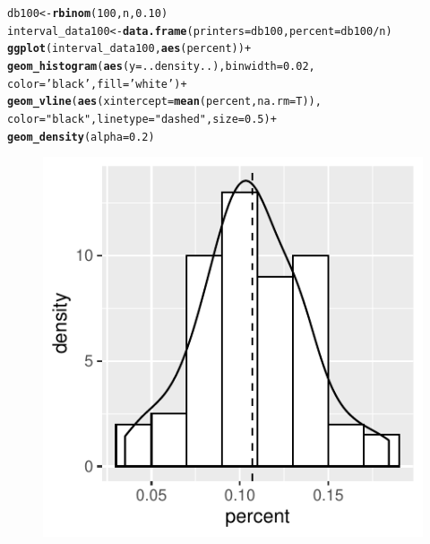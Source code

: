 \documentclass[10pt]{report}\usepackage[]{graphicx}\usepackage[]{xcolor}
\makeatletter
\def\maxwidth{ %
  \ifdim\Gin@nat@width>\linewidth
    \linewidth
  \else
    \Gin@nat@width
  \fi
}
\newcommand{\hlnum}[1]{\textcolor[rgb]{0.686,0.059,0.569}{#1}}%
\newcommand{\hlstr}[1]{\textcolor[rgb]{0.192,0.494,0.8}{#1}}%
\newcommand{\hlopt}[1]{\textcolor[rgb]{0,0,0}{#1}}%
\newcommand{\hlstd}[1]{\textcolor[rgb]{0.345,0.345,0.345}{#1}}%
\newcommand{\hlkwb}[1]{\textcolor[rgb]{0.69,0.353,0.396}{#1}}%
\newcommand{\hlkwc}[1]{\textcolor[rgb]{0.333,0.667,0.333}{#1}}%
\newcommand{\hlkwd}[1]{\textcolor[rgb]{0.737,0.353,0.396}{\textbf{#1}}}%
\newenvironment{kframe}{%
 \def\at@end@of@kframe{}%
 \ifinner\ifhmode%
  \def\at@end@of@kframe{\end{minipage}}%
  \begin{minipage}{\columnwidth}%
 \fi\fi%
 \def\FrameCommand##1{\hskip\@totalleftmargin \hskip-\fboxsep
 \colorbox{shadecolor}{##1}\hskip-\fboxsep
     \hskip-\linewidth \hskip-\@totalleftmargin \hskip\columnwidth}%
 \MakeFramed {\advance\hsize-\width
   \@totalleftmargin\z@ \linewidth\hsize
   \@setminipage}}%
 {\par\unskip\endMakeFramed%
 \at@end@of@kframe}
\newenvironment{knitrout}{}{} %
\makeatother
\begin{document}
\begin{easylist}[enumerate]
\begin{knitrout}
\color{fgcolor}\begin{kframe}
\begin{alltt}
         \hlstd{db100} \hlkwb{<-} \hlkwd{rbinom}\hlstd{(}\hlnum{100}\hlstd{, n,} \hlnum{0.10}\hlstd{)}
         \hlstd{interval_data100} \hlkwb{<-} \hlkwd{data.frame}\hlstd{(}\hlkwc{printers}\hlstd{=db100,} \hlkwc{percent}\hlstd{=db100}\hlopt{/}\hlstd{n)}
         \hlkwd{ggplot}\hlstd{(interval_data100,} \hlkwd{aes}\hlstd{(percent))} \hlopt{+}
                    \hlkwd{geom_histogram}\hlstd{(}\hlkwd{aes}\hlstd{(}\hlkwc{y}\hlstd{=..density..),} \hlkwc{binwidth}\hlstd{=}\hlnum{0.02}\hlstd{,}
                                   \hlkwc{color}\hlstd{=}\hlstr{'black'}\hlstd{,} \hlkwc{fill}\hlstd{=}\hlstr{'white'}\hlstd{)} \hlopt{+}
                    \hlkwd{geom_vline}\hlstd{(}\hlkwd{aes}\hlstd{(}\hlkwc{xintercept}\hlstd{=}\hlkwd{mean}\hlstd{(percent,} \hlkwc{na.rm}\hlstd{=T)),}
                               \hlkwc{color}\hlstd{=}\hlstr{"black"}\hlstd{,} \hlkwc{linetype}\hlstd{=}\hlstr{"dashed"}\hlstd{,} \hlkwc{size}\hlstd{=}\hlnum{0.5}\hlstd{)} \hlopt{+}
                    \hlkwd{geom_density}\hlstd{(}\hlkwc{alpha}\hlstd{=}\hlnum{0.2}\hlstd{)}
\end{alltt}
\end{kframe}\begin{figure}[H]

{\centering \includegraphics[width=\maxwidth]{figure/interval_data-1} 

}
\end{figure}
\end{knitrout}
\end{easylist}
\end{document}
